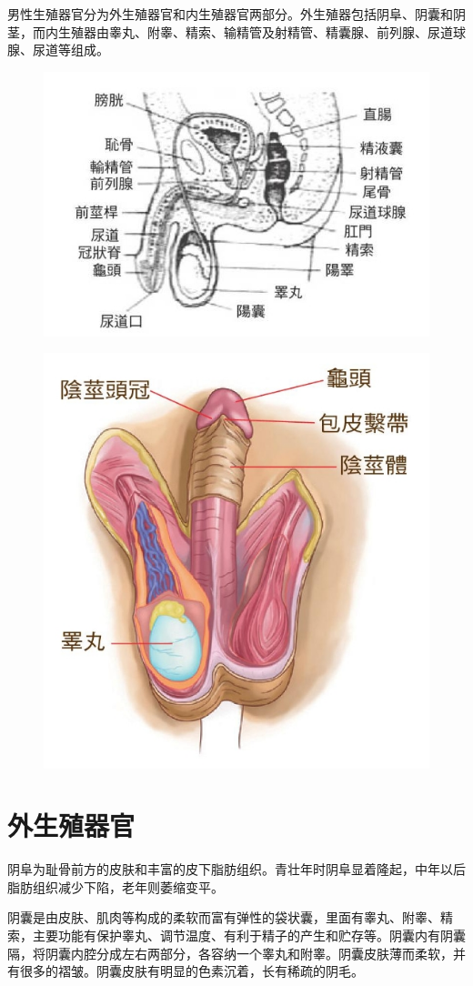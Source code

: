 \documentclass[12pt,UTF8]{ctexbook}
\begin{document}
男性生殖器官分为外生殖器官和内生殖器官两部分。外生殖器包括阴阜、阴囊和阴茎，而内生殖器由睾丸、附睾、精索、输精管及射精管、精囊腺、前列腺、尿道球腺、尿道等组成。

\begin{figure}[htbp]
	\centering
	\includegraphics[width=0.7\linewidth]{4}
	\caption{}
\end{figure}

\begin{figure}[htbp]
	\centering
	\includegraphics[width=0.7\linewidth]{13}
	\caption{}
\end{figure}

\section{外生殖器官}

阴阜为耻骨前方的皮肤和丰富的皮下脂肪组织。青壮年时阴阜显着隆起，中年以后脂肪组织减少下陷，老年则萎缩变平。

阴囊是由皮肤、肌肉等构成的柔软而富有弹性的袋状囊，里面有睾丸、附睾、精索，主要功能有保护睾丸、调节温度、有利于精子的产生和贮存等。阴囊内有阴囊隔，将阴囊内腔分成左右两部分，各容纳一个睾丸和附睾。阴囊皮肤薄而柔软，并有很多的褶皱。阴囊皮肤有明显的色素沉着，长有稀疏的阴毛。
\end{document}
